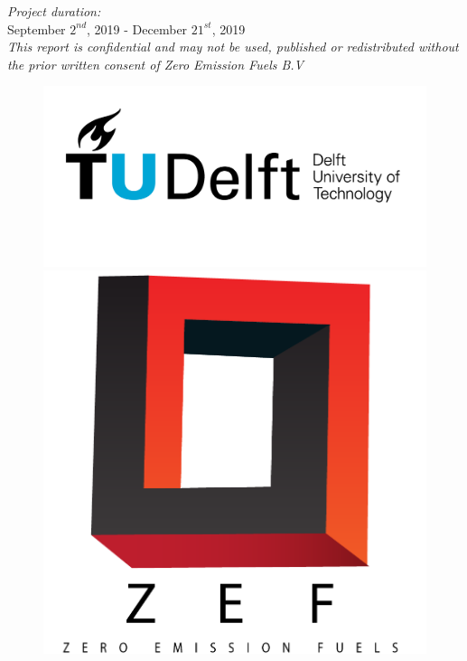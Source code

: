 \documentclass[12pt]{extarticle}
\begin{document}
\begin{titlepage}
\emph{Project duration:}\\
September $2^{nd}$, 2019 - December $21^{st}$, 2019
\\[2cm]
\centering
\textit{This report is confidential and may not be used, published or redistributed without the prior written consent of Zero Emission Fuels B.V}
\begin{figure}[H]
\centering
\begin{minipage}{.5\textwidth}
  \centering
  \includegraphics[width=\linewidth]{images/TU_delft_logo.jpg}
\end{minipage}%
\begin{minipage}{.5\textwidth}
  \centering
  \includegraphics[scale=0.15]{images/zef.png}
\end{minipage}
\end{figure}
\end{titlepage}
\end{document}
